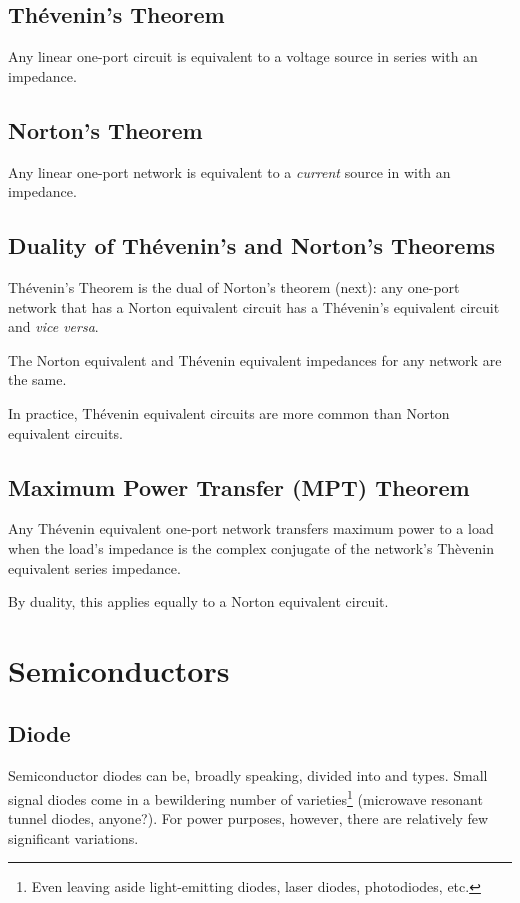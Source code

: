 \documentclass[11pt]{article}
\begin{document}
\subsection{Th\'evenin's Theorem}

Any linear one-port circuit is equivalent to a voltage source in
series with an impedance.

\subsection{Norton's Theorem}

Any linear one-port network is equivalent to a \emph{current} source
in  with an impedance.

\subsection{Duality of Th\'evenin's and Norton's Theorems}

Th\'evenin's Theorem is the dual of Norton's theorem (next): any
one-port network that has a Norton equivalent circuit has a
Th\'evenin's equivalent circuit and {\it vice versa}.

The Norton equivalent and Th\'evenin equivalent impedances for any
network are the same.

In practice, Th\'evenin equivalent circuits are more common than
Norton equivalent circuits.


\subsection{Maximum Power Transfer (MPT) Theorem}

Any Th\'evenin equivalent one-port network transfers maximum power to
a load when the load's impedance is the complex conjugate of the
network's Th\`evenin equivalent series impedance.

By duality, this applies equally to a Norton equivalent circuit.


\section{Semiconductors}

\subsection{Diode}

Semiconductor diodes can be, broadly speaking, divided into
 and  types. Small signal diodes come
in a bewildering number of varieties\footnote{Even leaving aside
  light-emitting diodes, laser diodes, photodiodes, etc.} (microwave
resonant tunnel diodes, anyone?). For power purposes, however, there
are relatively few significant variations.
\end{document}
